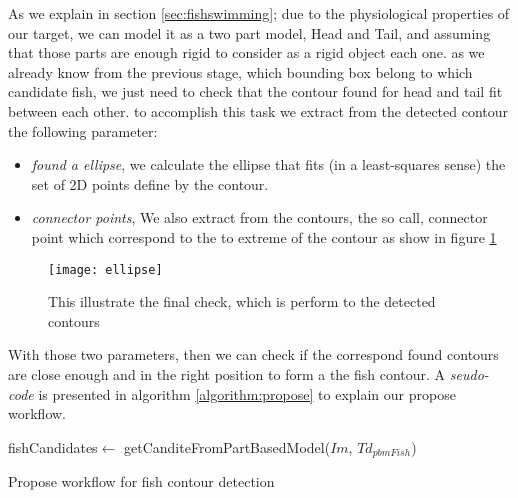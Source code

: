 As we explain in section \ref{sec:fishswimming}; due to the physiological properties of
our target, we can model it as a two part model, Head and Tail, and assuming that those
parts are enough rigid to consider as a rigid object each one. as we already know from 
the previous stage, which bounding box belong to which candidate fish, we just need to check
that the contour found for head and tail fit between each other. to accomplish this task
we extract from the detected contour the following parameter:
\begin{itemize}
\item \textit{found a ellipse}, we calculate the ellipse that fits (in a least-squares sense) the set of 2D points define by the contour.
\item \textit{connector points}, We also extract from the contours, the so call, connector point
which correspond to the to extreme of the contour as show in figure \ref{fig:ellipse}
\end{itemize}

\begin{figure}[ht]
\begin{adjustwidth}{-1in}{-1in}
\centering
\texttt{[image: ellipse]}
\caption{This illustrate the final check, which is perform to the detected contours}
\label{fig:ellipse}
\end{adjustwidth}
\end{figure}

With those two parameters, then we can check if the correspond found contours are close enough
and in the right position to form a the fish contour. A \textit{seudo-code} is presented 
in algorithm \ref{algorithm:propose}
to explain our propose workflow.


\begin{adjustwidth}{-1in}{-1in}
\begin{algorithm}
\label{algorithm:propose}
\BlankLine
\emph{	}\;
fishCandidates$\leftarrow$ getCanditeFromPartBasedModel($Im$, $Td_{pbmFish}$)\;
\caption{Propose workflow for fish contour detection}\label{algo_disjdecomp}
\end{algorithm}
\end{adjustwidth}
